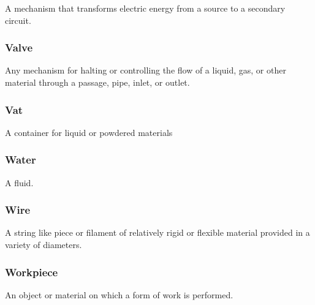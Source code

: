 A mechanism that transforms electric energy from a source to a secondary circuit.

\FloatBarrier

\subsubsection{Valve}
  \label{sec:Valve}


Any mechanism for halting or controlling the flow of a liquid, gas, or other material through a passage, pipe, inlet, or outlet.

\FloatBarrier

\subsubsection{Vat}
  \label{sec:Vat}


A container for liquid or powdered materials

\FloatBarrier

\subsubsection{Water}
  \label{sec:Water}


A fluid.

\FloatBarrier

\subsubsection{Wire}
  \label{sec:Wire}


A string like piece or filament of relatively rigid or flexible material provided in a variety of diameters.

\FloatBarrier

\subsubsection{Workpiece}
  \label{sec:Workpiece}


An object or material on which a form of work is performed.

\FloatBarrier
